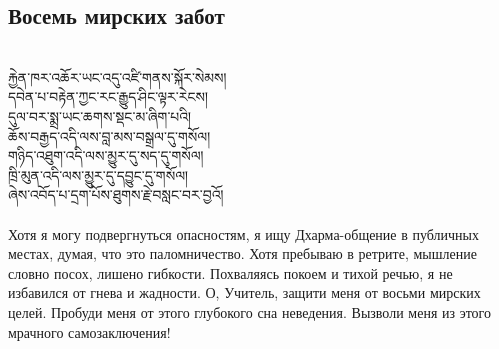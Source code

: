 \subsection*{Восемь мирских забот}
\\
\ti
རྐྱེན་ཁར་འཆོར་ཡང་འདུ་འཛི་གནས་སྐོར་སེམས།\\
དབེན་པ་བརྟེན་ཀྱང་རང་རྒྱུད་ཤིང་ལྟར་རེངས། \\
དུལ་བར་སྨྲ་ཡང་ཆགས་སྡང་མ་ཞིག་པའི། \\
ཆོས་བརྒྱད་འདི་ལས་བླ་མས་བསྒྲལ་དུ་གསོལ། \\
གཉིད་འཐུག་འདི་ལས་མྱུར་དུ་སད་དུ་གསོལ། \\
ཁྲི་མུན་འདི་ལས་མྱུར་དུ་དབྱུང་དུ་གསོལ། \\
ཞེས་འབོད་པ་དྲག་པོས་ཐུགས་རྗེ་བསླང་བར་བྱའོ།\\
\\
\ru
Хотя я могу подвергнуться опасностям, я ищу Дхарма-общение
в публичных местах, думая, что это паломничество.
Хотя пребы\-ваю в ретрите, мышление словно посох, лишено гибкости.
По\-хваляясь покоем и тихой речью, я не избавился от гнева и жадности.
О, Учитель, защити меня от восьми мирских целей.
Пробуди меня от этого глубокого сна неведения.
Вызволи меня из этого мрачного самозаключения!

